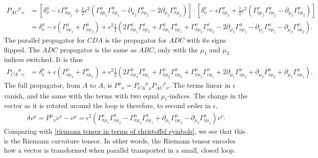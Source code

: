 \begin{align}
    \nonumber
    {P_{AC}}^\mu{}_{\nu}
    & = 
    \left[ 
        \delta^\mu_\sigma 
        -\epsilon \Gamma^{\mu}_{\sigma \mu_1}
        + \frac{1}{2} \epsilon^2 
        \left(
        \Gamma^\mu_{\eta \mu_1}\Gamma^\eta_{\sigma \mu_1}
        - \partial_{\mu_2} \Gamma^{\mu}_{\sigma \mu_2}
        - 2 \partial_{\mu_2} \Gamma^{\mu}_{\sigma \mu_1}
        \right)
    \right]
    \cdot 
    \left[
        \delta^\sigma_\nu
        - \epsilon \Gamma^{\sigma}_{\nu \mu_2}
        + \frac{1}{2} \epsilon^2 
        \left(
            \Gamma^\sigma_{\eta \mu_2}\Gamma^\eta_{\nu \mu_2}
            - \partial_{\mu_2} \Gamma^{\sigma}_{\nu \mu_2}
        \right)
    \right] \\ \nonumber
    & =
    \delta^\mu_\nu
    - \epsilon 
    \left(
        \Gamma^{\mu}_{\nu \mu_1}
        +
        \Gamma^{\mu}_{\nu \mu_2}
    \right)
    + \epsilon^2
    \frac{1}{2}
    \left(  
        2\Gamma^{\mu}_{\sigma \mu_1} \Gamma^{\sigma}_{\nu \mu_2}
        + \Gamma^\mu_{\sigma \mu_1}\Gamma^\sigma_{\nu \mu_1}
        + \Gamma^\mu_{\sigma \mu_2}\Gamma^\sigma_{\nu \mu_2}
        - 2 \partial_{\mu_2} \Gamma^{\mu}_{\nu \mu_1}
        - \partial_{\mu_1} \Gamma^{\mu}_{\nu \mu_1}
        - \partial_{\mu_2} \Gamma^{\mu}_{\nu \mu_2}
    \right).
\end{align}
%
The parallel propagator for $CDA$ is the propagator for $ADC$ with its signs flipped. 
The $ADC$ propagator is the same as $ABC$, only with the $\mu_1$ and $\mu_2$ indices switched.
It is thus
%
\begin{align}
    \nonumber
    {P_{CA}}^\mu{}_\nu
    & =
    \delta^\mu_\nu
    + \epsilon 
    \left(
        \Gamma^{\mu}_{\nu \mu_2}
        +
        \Gamma^{\mu}_{\nu \mu_1}
    \right)
    + \epsilon^2
    \frac{1}{2}
    \left(  
        2\Gamma^{\mu}_{\sigma \mu_2} \Gamma^{\sigma}_{\nu \mu_1}
        + \Gamma^\mu_{\sigma \mu_2}\Gamma^\sigma_{\nu \mu_2}
        + \Gamma^\mu_{\sigma \mu_1}\Gamma^\sigma_{\nu \mu_1}
        + 2 \partial_{\mu_1} \Gamma^{\mu}_{\nu \mu_2}
        + \partial_{\mu_2} \Gamma^{\mu}_{\nu \mu_2}
        + \partial_{\mu_1} \Gamma^{\mu}_{\nu \mu_1}
    \right).
\end{align}
%
The full propagator, from $A$ to $A$, is $P^\mu{}_\nu = {P_{CA}}^\mu{}_\rho {P_{AC}}^\rho{}_\nu$.
The terms linear in $\epsilon$ vanish, and the same with the terms with two equal $\mu_i$-indices.
The change in the vector as it is rotated around the loop is therefore, to second order in $\epsilon$,
%
\begin{align}
    \delta v^\mu 
    = P^\mu{}_\nu v^\nu - v^\mu 
    = \epsilon^2  
    \left(
        \Gamma^\mu_{\sigma \mu_1} \Gamma^\sigma_{\nu \mu_2}
        -\Gamma^\mu_{\sigma \mu_2} \Gamma^\sigma_{\nu \mu_1}
        + \partial_{\mu_1} \Gamma^{\mu}_{\nu \mu_2}
        - \partial_{\mu_2} \Gamma^{\mu}_{\nu \mu_1} 
    \right) v^\nu.
\end{align}
Comparing with \autoref{riemann tensor in terms of christoffel symbols}, we see that this is the Riemann curvature tensor.
In other words, the Riemann tensor encodes how a vector is transformed when parallel transported in a small, closed loop.




